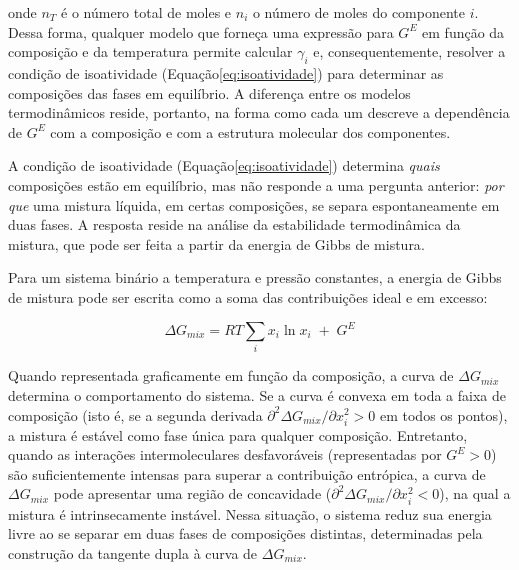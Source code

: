 \noindent onde $n_T$ é o número total de moles e $n_i$ o número de moles do componente $i$. Dessa forma, qualquer modelo que forneça uma expressão para $G^E$ em função da composição e da temperatura permite calcular $\gamma_i$ e, consequentemente, resolver a condição de isoatividade (Equação\ref{eq:isoatividade}) para determinar as composições das fases em equilíbrio. A diferença entre os modelos termodinâmicos reside, portanto, na forma como cada um descreve a dependência de $G^E$ com a composição e com a estrutura molecular dos componentes.


A condição de isoatividade (Equação\ref{eq:isoatividade}) determina \textit{quais} composições estão em equilíbrio, mas não responde a uma pergunta anterior: \textit{por que} uma mistura líquida, em certas composições, se separa espontaneamente em duas fases. A resposta reside na análise da estabilidade termodinâmica da mistura, que pode ser feita a partir da energia de Gibbs de mistura\cite{smith2005}.

Para um sistema binário a temperatura e pressão constantes, a energia de Gibbs de mistura pode ser escrita como a soma das contribuições ideal e em excesso:

\begin{equation}
    \Delta G_{mix} = RT \sum_{i} x_i \ln x_i \;+\; G^E
    \label{eq:gmix_total}
\end{equation}

Quando representada graficamente em função da composição, a curva de $\Delta G_{mix}$ determina o comportamento do sistema. Se a curva é convexa em toda a faixa de composição (isto é, se a segunda derivada $\partial^2 \Delta G_{mix} / \partial x_i^2 > 0$ em todos os pontos), a mistura é estável como fase única para qualquer composição. Entretanto, quando as interações intermoleculares desfavoráveis (representadas por $G^E > 0$) são suficientemente intensas para superar a contribuição entrópica, a curva de $\Delta G_{mix}$ pode apresentar uma região de concavidade ($\partial^2 \Delta G_{mix} / \partial x_i^2 < 0$), na qual a mistura é intrinsecamente instável\cite{smith2005}. Nessa situação, o sistema reduz sua energia livre ao se separar em duas fases de composições distintas, determinadas pela construção da tangente dupla à curva de $\Delta G_{mix}$.

